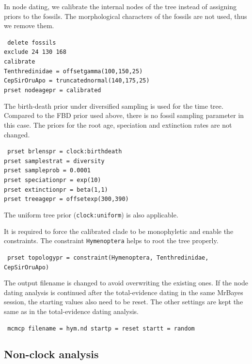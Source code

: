 \documentclass[12pt]{article}
\begin{document}
In node dating, we calibrate the internal nodes of the tree instead of assigning priors to the fossils.
The morphological characters of the fossils are not used, thus we remove them.
\begin{framed}
{\tt \noindent
delete fossils \\
exclude 24 130 168 \\
calibrate \\
\indent Tenthredinidae = offsetgamma(100,150,25) \\
\indent CepSirOruApo = truncatednormal(140,175,25) \\
prset nodeagepr = calibrated}
\end{framed}

The birth-death prior under diversified sampling \citep{Hohna:2011hd} is used for the time tree.
Compared to the FBD prior used above, there is no fossil sampling parameter in this case.
The priors for the root age, speciation and extinction rates are not changed.
\begin{framed}
{\tt \noindent
prset brlenspr = clock:birthdeath    \\
prset samplestrat = diversity        \\
prset sampleprob = 0.0001            \\
prset speciationpr = exp(10)         \\
prset extinctionpr = beta(1,1)       \\
prset treeagepr = offsetexp(300,390)}
\end{framed}
\noindent The uniform tree prior ({\tt clock:uniform}) is also applicable.

It is required to force the calibrated clade to be monophyletic and enable the constraints.
The constraint {\tt Hymenoptera} helps to root the tree properly.
\begin{framed}
{\tt \noindent
prset topologypr = constraint(Hymenoptera, Tenthredinidae, CepSirOruApo)}
\end{framed}

The output filename is changed to avoid overwriting the existing ones.
If the node dating analysis is continued after the total-evidence dating in the same MrBayes session, the starting values also need to be reset.
The other settings are kept the same as in the total-evidence dating analysis.
\begin{framed}
{\tt \noindent
mcmcp filename = hym.nd startp = reset startt = random}
\end{framed}

\subsection{Non-clock analysis}
\end{document}
